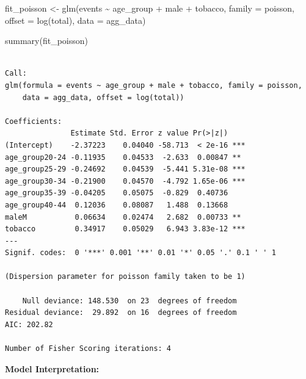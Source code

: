 \documentclass[
  letterpaper,
  DIV=11,
  numbers=noendperiod]{scrreprt}
\newenvironment{Shaded}{\begin{snugshade}}{\end{snugshade}}
\newcommand{\AttributeTok}[1]{\textcolor[rgb]{0.40,0.45,0.13}{#1}}
\newcommand{\FunctionTok}[1]{\textcolor[rgb]{0.28,0.35,0.67}{#1}}
\newcommand{\NormalTok}[1]{\textcolor[rgb]{0.00,0.23,0.31}{#1}}
\newcommand{\OtherTok}[1]{\textcolor[rgb]{0.00,0.23,0.31}{#1}}
\newcommand{\SpecialCharTok}[1]{\textcolor[rgb]{0.37,0.37,0.37}{#1}}
\begin{document}
\begin{Shaded}
\begin{Highlighting}[]
\NormalTok{fit\_poisson }\OtherTok{\textless{}{-}} \FunctionTok{glm}\NormalTok{(events }\SpecialCharTok{\textasciitilde{}}\NormalTok{ age\_group }\SpecialCharTok{+}\NormalTok{ male }\SpecialCharTok{+}\NormalTok{ tobacco,}
                   \AttributeTok{family =}\NormalTok{ poisson,}
                   \AttributeTok{offset =} \FunctionTok{log}\NormalTok{(total),}
                   \AttributeTok{data =}\NormalTok{ agg\_data)}

\FunctionTok{summary}\NormalTok{(fit\_poisson)}
\end{Highlighting}
\end{Shaded}

\begin{verbatim}

Call:
glm(formula = events ~ age_group + male + tobacco, family = poisson, 
    data = agg_data, offset = log(total))

Coefficients:
               Estimate Std. Error z value Pr(>|z|)    
(Intercept)    -2.37223    0.04040 -58.713  < 2e-16 ***
age_group20-24 -0.11935    0.04533  -2.633  0.00847 ** 
age_group25-29 -0.24692    0.04539  -5.441 5.31e-08 ***
age_group30-34 -0.21900    0.04570  -4.792 1.65e-06 ***
age_group35-39 -0.04205    0.05075  -0.829  0.40736    
age_group40-44  0.12036    0.08087   1.488  0.13668    
maleM           0.06634    0.02474   2.682  0.00733 ** 
tobacco         0.34917    0.05029   6.943 3.83e-12 ***
---
Signif. codes:  0 '***' 0.001 '**' 0.01 '*' 0.05 '.' 0.1 ' ' 1

(Dispersion parameter for poisson family taken to be 1)

    Null deviance: 148.530  on 23  degrees of freedom
Residual deviance:  29.892  on 16  degrees of freedom
AIC: 202.82

Number of Fisher Scoring iterations: 4
\end{verbatim}

\textbf{Model Interpretation:}
\end{document}
